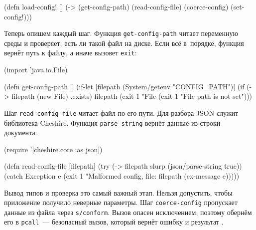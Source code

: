 
\begin{english}
  \begin{clojure}
(defn load-config! []
  (-> (get-config-path)
      (read-config-file)
      (coerce-config)
      (set-config!)))
  \end{clojure}
\end{english}

Теперь опишем каждый шаг. Функция \verb|get-config-path| читает переменную
среды и проверяет, есть ли такой файл на диске. Если всё в~порядке, функция
вернёт путь к файлу, а иначе вызовет \verb|exit|:


\begin{english}
  \begin{clojure}
(import 'java.io.File)

(defn get-config-path []
  (if-let [filepath (System/getenv "CONFIG_PATH")]
    (if (-> filepath (new File) .exists)
      filepath
      (exit 1 "File %
    (exit 1 "File path is not set")))
  \end{clojure}
\end{english}

Шаг \verb|read-config-file| читает файл по его пути. Для разбора JSON служит
библиотека Cheshire. Функция \verb|parse-string| вернёт данные из
строки документа.


\begin{english}
  \begin{clojure}
(require '[cheshire.core :as json])

(defn read-config-file
  [filepath]
  (try
    (-> filepath slurp (json/parse-string true))
    (catch Exception e
      (exit 1 "Malformed config, file: %
            filepath (ex-message e)))))
  \end{clojure}
\end{english}


Вывод типов и проверка это самый важный этап. Нельзя допустить, чтобы приложение
получило неверные параметры. Шаг \verb|coerce-config| пропускает данные из файла
через \verb|s/conform|. Вызов опасен исключением, поэтому обернём его в
\verb|pcall|~--- безопасный вызов, который вернёт ошибку и
результат .

